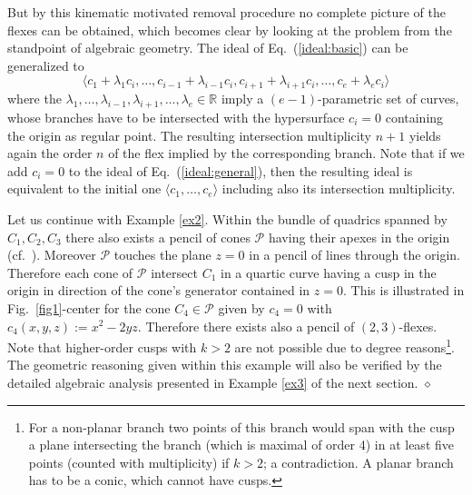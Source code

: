 \documentclass{svproc}
\def\RR{{\mathbb R}}
\begin{document}
But by this kinematic motivated removal procedure no complete picture of the flexes 
can be obtained, which becomes clear by 
looking at the problem from the standpoint of algebraic geometry. 
The ideal of Eq.\ (\ref{ideal:basic}) can be generalized to
\begin{equation}\label{ideal:general}
\langle c_1+\lambda_1c_i,\ldots, c_{i-1}+\lambda_{i-1}c_{i},c_{i+1}+\lambda_{i+1}c_{i},\ldots , c_e+\lambda_ec_i \rangle
\end{equation}
where the $\lambda_1,\ldots,\lambda_{i-1},\lambda_{i+1},\ldots,\lambda_e\in\RR$ imply a $(e-1)$-parametric set of curves, 
whose branches have to be intersected with the  hypersurface $c_i=0$ containing the origin as regular point. The resulting intersection multiplicity $n+1$ yields again the order $n$ of the flex implied by the corresponding branch. 
 Note that if we add $c_i=0$ to the 
ideal  
 of Eq.\ (\ref{ideal:general}), then the resulting ideal 
is equivalent to the 
initial one $\langle c_1,\ldots,c_e\rangle $ 
including also its intersection multiplicity.


\begin{example}\label{ex:con} Let us continue with Example \ref{ex2}.  
Within the bundle of quadrics spanned by $C_1,C_2,C_3$ there also exists a pencil of cones $\mathcal{P}$ having their apexes in the origin (cf.\ \cite{li}). 
Moreover $\mathcal{P}$ touches the plane 
$z=0$ in a pencil of lines through the origin. 
Therefore each cone of $\mathcal{P}$ intersect $C_1$ in a quartic curve having a cusp in the origin in direction of the cone's generator contained in $z=0$. 
This is illustrated in Fig.\ \ref{fig1}-center for the cone $C_4\in\mathcal{P}$ given by $c_4=0$ with $c_4(x,y,z):=x^2-2yz$. 
Therefore there exists also a pencil of $(2,3)$-flexes. 
Note that higher-order cusps with $k>2$ are not possible due to degree reasons\footnote{For a non-planar branch two points of this branch would span with the cusp a plane intersecting the branch (which is maximal of order 4) in at least five points (counted with multiplicity) if $k>2$; a contradiction. A planar branch has to be a conic, which cannot have cusps.}. 
The geometric reasoning given within this example  will also be verified by the detailed algebraic analysis presented in Example \ref{ex3} of the next section.
\hfill $\diamond$
\end{example}



\end{document}
